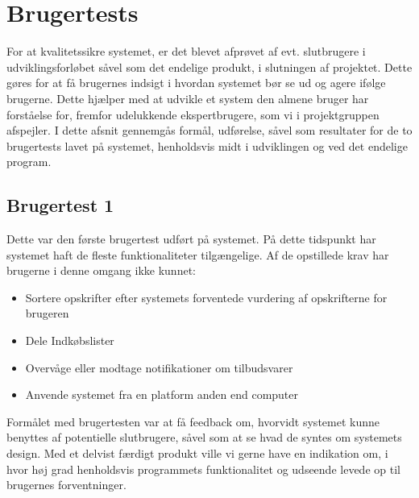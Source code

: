 \section{Brugertests}\label{s:brugertests}
For at kvalitetssikre systemet, er det blevet afprøvet af evt. slutbrugere i udviklingsforløbet såvel som det endelige produkt, i slutningen af projektet.
Dette gøres for at få brugernes indsigt i hvordan systemet bør se ud og agere ifølge brugerne.
Dette hjælper med at udvikle et system den almene bruger har forståelse for, fremfor udelukkende ekspertbrugere, som vi i projektgruppen afspejler.
I dette afsnit gennemgås formål, udførelse, såvel som resultater for de to brugertests lavet på systemet, henholdsvis midt i udviklingen og ved det endelige program.


\subsection{Brugertest 1}
Dette var den første brugertest udført på systemet.
På dette tidspunkt har systemet haft de fleste funktionaliteter tilgængelige.
Af de opstillede krav har brugerne i denne omgang ikke kunnet:
\begin{itemize}
   \item{Sortere opskrifter efter systemets forventede vurdering af opskrifterne for brugeren}
   \item{Dele Indkøbslister}
   \item{Overvåge eller modtage notifikationer om tilbudsvarer}
   \item{Anvende systemet fra en platform anden end computer}
\end{itemize}
Formålet med brugertesten var at få feedback om, hvorvidt systemet kunne benyttes af potentielle slutbrugere, såvel som at se hvad de syntes om systemets design.
Med et delvist færdigt produkt ville vi gerne have en indikation om, i hvor høj grad henholdsvis programmets funktionalitet og udseende levede op til brugernes forventninger.

